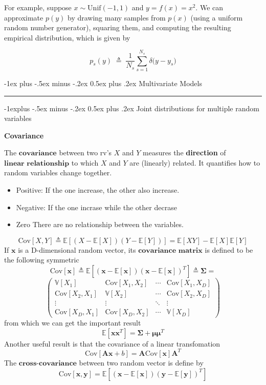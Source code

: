 \documentclass[10pt,landscape]{article}
\makeatletter
\newcommand{\cov}{\textrm{Cov}}
\newcommand{\mean}{\mathbb{E}}
\newcommand{\var}{\mathbb{V}}
\newcommand{\inp}{\textbf{x}}
\newcommand{\out}{\textbf{y}}
\newcommand{\Cov}{\mathbf{\Sigma}}
\newcommand{\Mean}{\boldsymbol{\mu}}
\renewcommand{\section}{\@startsection{section}{1}{0mm}%
                                {-1ex plus -.5ex minus -.2ex}%
                                {0.5ex plus .2ex}%
                                {\normalfont\large\bfseries}}
\renewcommand{\subsection}{\@startsection{subsection}{2}{0mm}%
                                {-1explus -.5ex minus -.2ex}%
                                {0.5ex plus .2ex}%
                                {\normalfont\normalsize\bfseries}}
\makeatother
\begin{document}
\begin{multicols*}{3}
For example, suppose $x \sim \mathrm{Unif}(-1,1)$ and $y = f(x) = x^2$. 
We can approximate $p(y)$ by drawing many samples from $p(x)$ 
(using a uniform random number generator), squaring them, and 
computing the resulting empirical distribution, which is given by

\begin{equation*}
p_s(y) \;\triangleq\; \frac{1}{N_s} \sum_{s=1}^{N_s} \delta\bigl(y - y_s\bigr)
\end{equation*}

\section{Multivariate Models}\smallskip \hrule height 2pt \smallskip

\subsection{Joint distributions for multiple random variables}

\textbf{Covariance}

The $\textbf{covariance}$ between two rv's $X$ and $Y$ measures the \textbf{direction} of $\textbf{linear relationship}$ to which $X$ and $Y$ are (linearly) related. It quantifies how to random variables change together.
\begin{itemize}
    \item Positive: If the one increase, the other also increase.
    \item Negative: If the one incrase while the other decrase
    \item Zero There are no relationship between the variables. 
\end{itemize}

\[
    \cov[X,Y]\triangleq\mean[(X-\mean[X])(Y-\mean[Y])]=\mean[XY]-\mean[X]\mean[Y]
\]
If $\inp$ is a D-dimensional random vector, its $\textbf{covariance matrix}$ is defined to be the following symmetric
\[
    \cov[\inp]\triangleq\mean[(\inp-\mean[\inp])(\inp-\mean[\inp])^T] \triangleq \boldsymbol{\Cov} = 
\]
\[
    \begin{pmatrix}
        \var[X_1] & \cov[X_1,X_2] & \cdots & \cov[X_1,X_D] \\
        \cov[X_2,X_1] & \var[X_2] & \cdots &\cov[X_2,X_D] \\
        \vdots & \vdots & \ddots & \vdots \\ 
        \cov[X_D,X_1] & \cov[X_D,X_2] & \cdots & \var[X_D]
    \end{pmatrix}
\]
from which we can get the important result
\[
    \mean[\inp\inp^T] = \Cov +\Mean\Mean^T
\]
Another useful result is that the covariance of a linear transfomation
\[
    \cov[\mathbf{A}\inp+b]=\mathbf{A}\cov[\inp]\mathbf{A}^T
\]
The $\textbf{cross-covariance}$ between two random vector is define by
\[
    \cov[\inp,\out]=\mean[(\inp-\mean[\inp])(\out-\mean[\out])^T]
\]


\end{multicols*}
\end{document}
